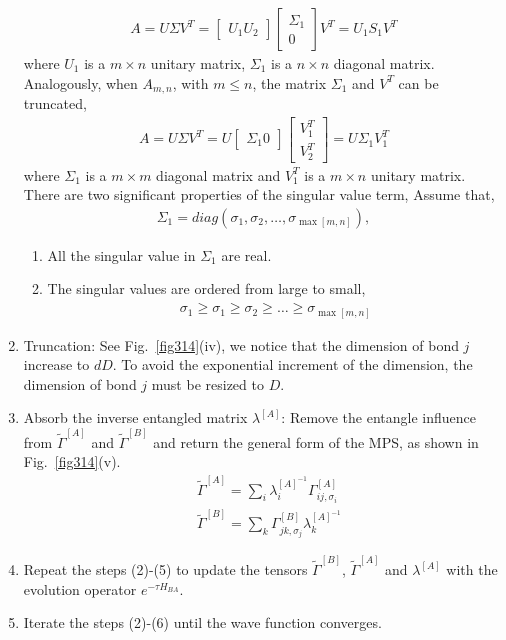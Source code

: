 \begin{enumerate}
		\begin{align}
			A = U \Sigma V^T = \begin{bmatrix} U_1 U_2 \end{bmatrix} \begin{bmatrix} \Sigma_1 \\ 0 \end{bmatrix} V^T = U_1 S_1 V^T
		\end{align}
		where $U_1$ is a $m \times n$ unitary matrix, $\Sigma_1$ is a $n \times n$ diagonal matrix. Analogously, when $A_{m,n}$, with $m \leq n$, the matrix $\Sigma_1$ and $V^T$ can be truncated,
\begin{align}
	A = U \Sigma V^T = U \begin{bmatrix} \Sigma_1 0 \end{bmatrix} \begin{bmatrix} V_1^T \\ V_2^T \end{bmatrix} = U \Sigma_1 V_1^T
\end{align}
where $\Sigma_1$ is a $m \times m$ diagonal matrix and $V_1^T$ is a $m \times n$ unitary matrix. There are two significant properties of the singular value term, Assume that,
\begin{align}
\Sigma_1 = diag \left(\sigma_1, \sigma_2, \dots, \sigma_{\max{[m,n]}} \right), 
\end{align}
\begin{enumerate}
	\item All the singular value in $\Sigma_1$ are real.
	\item The singular values are ordered from large to small,
		\begin{align}
			\sigma_1 \geq \sigma_1 \geq \sigma_2 \geq \dots \geq \sigma_{\max{[m,n]}}
		\end{align}
\end{enumerate}
		\item Truncation: See Fig.~\ref{fig314}(iv), we notice that the dimension of bond $j$ increase to $dD$. To avoid the exponential increment of the dimension, the dimension of bond $j$ must be resized to $D$.
		\item Absorb the inverse entangled matrix $\lambda^{[A]}$: Remove the entangle influence from $\widetilde{\Gamma}^{[A]}$ and $\widetilde{\Gamma}^{[B]}$ and return the general form of the MPS, as shown in Fig.~\ref{fig314}(v).
			\begin{align}
				&\widetilde{\Gamma}^{[A]} = \sum_{i}{ \lambda_{i}^{[A]^{-1}} \Gamma^{[A]}_{ij,\sigma_i}} \\
				&\widetilde{\Gamma}^{[B]} = \sum_{k}{\Gamma^{[B]}_{jk,\sigma_j} \lambda_{k}^{[A]^{-1}}}
			\end{align}
		\item Repeat the steps (2)-(5) to update the tensors $\widetilde{\Gamma}^{[B]}$, $\widetilde{\Gamma}^{[A]}$ and $\lambda^{[A]}$ with the evolution operator $e^{-\tau H_{BA}}$.
		\item Iterate the steps (2)-(6) until the wave function converges.
\end{enumerate}

